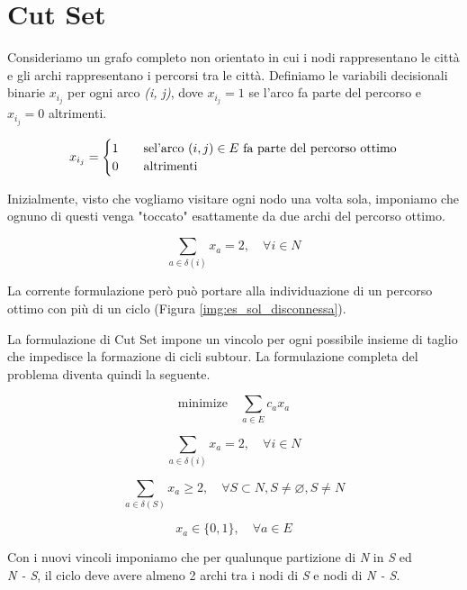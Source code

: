\section{Cut Set}
Consideriamo un grafo completo non orientato in cui i nodi rappresentano le città e gli archi rappresentano i percorsi tra le città. Definiamo le variabili decisionali binarie \begin{math}x_{i_j}\end{math} per ogni arco \textit{(i, j)}, dove \begin{math}x_{i_j} = 1\end{math} se l'arco fa parte del percorso e \begin{math}x_{i_j} = 0\end{math} altrimenti. 

\[ x_{i_j} =
  \begin{cases}
    1       & \quad \text{se} \text{l'arco \begin{math}(i, j) \in E\end{math} fa parte del percorso ottimo}\\
    0  & \quad \text{altrimenti}
  \end{cases}
\]

Inizialmente, visto che vogliamo visitare ogni nodo una volta sola, imponiamo che ognuno di questi venga "toccato" esattamente da due archi del percorso ottimo.

\[
\sum_{a \in \delta(i)} x_a = 2, \quad \forall i \in N
\]

La corrente formulazione però può portare alla individuazione di un percorso ottimo con più di un ciclo (Figura \ref{img:es_sol_disconnessa}).

La formulazione di Cut Set impone un vincolo per ogni possibile insieme di taglio che impedisce la formazione di cicli subtour. La formulazione completa del problema diventa quindi la seguente.


\[
\text{minimize} \quad \sum_{a \in E} c_a x_a
\]

\[
\sum_{a \in \delta(i)} x_a = 2, \quad \forall i \in N
\]

\[
\sum_{a \in \delta(S)} x_a \geq 2, \quad \forall S \subset N, S \ne \varnothing, S \ne N
\]

\[
x_a \in \{0, 1\}, \quad \forall a \in E
\]

Con i nuovi vincoli imponiamo che per qualunque partizione di \textit{N} in \textit{S} ed \\ \textit{N - S}, il ciclo deve 
avere almeno 2 archi tra i nodi di \textit{S} e nodi di \textit{N - S}.

